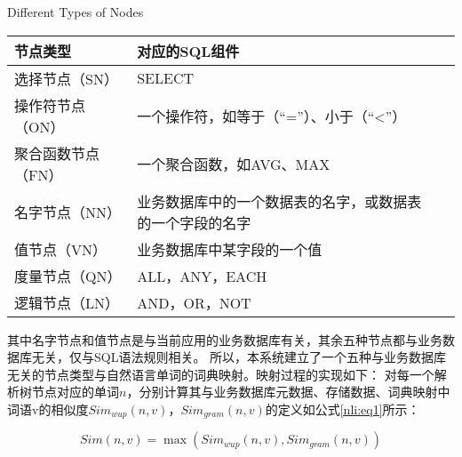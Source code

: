 \begin{table}[!hpb]
  \centering
    {Different Types of Nodes}
  \label{nli:jxsjddlx}
  \begin{tabular}{@{}llr@{}} \toprule
    节点类型 & 对应的SQL组件\\\midrule
    选择节点（SN） & SELECT\\
    操作符节点（ON） & 一个操作符，如等于（“=”）、小于（“<”）\\
    聚合函数节点（FN） & 一个聚合函数，如AVG、MAX\\
    名字节点（NN） & 业务数据库中的一个数据表的名字，或数据表的一个字段的名字\\
    值节点（VN） & 业务数据库中某字段的一个值\\
    度量节点（QN） & ALL，ANY，EACH\\
    逻辑节点（LN） & AND，OR，NOT\\\bottomrule

  \end{tabular}
\end{table}


其中名字节点和值节点是与当前应用的业务数据库有关，其余五种节点都与业务数据库无关，仅与SQL语法规则相关。
所以，本系统建立了一个五种与业务数据库无关的节点类型与自然语言单词的词典映射。映射过程的实现如下：
对每一个解析树节点对应的单词$n$，分别计算其与业务数据库元数据、存储数据、词典映射中词语v的相似度$Sim_{wup}(n,v)$，$Sim_{gram}(n,v)$的定义如公式\ref{nli:eq1}所示：

  \begin{equation}
    \label{nli:eq1}
    Sim(n,v) = \max(Sim_{wup}(n,v),Sim_{gram}(n,v))
\end{equation}

